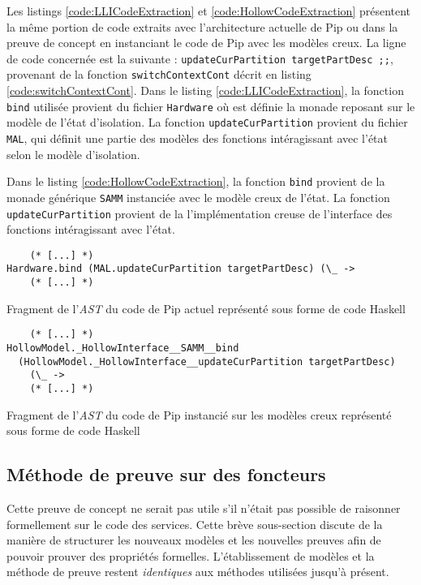 	Les listings \ref{code:LLICodeExtraction} et \ref{code:HollowCodeExtraction} présentent la même portion de code extraits avec l'architecture actuelle de Pip ou dans la preuve de concept en instanciant le code de Pip avec les modèles creux. La ligne de code concernée est la suivante : \texttt{updateCurPartition targetPartDesc ;;}, provenant de la fonction \texttt{switchContextCont} décrit en listing \ref{code:switchContextCont}. Dans le listing \ref{code:LLICodeExtraction}, la fonction \texttt{bind} utilisée provient du fichier \texttt{Hardware} où est définie la monade reposant sur le modèle de l'état d'isolation. La fonction \texttt{updateCurPartition} provient du fichier \texttt{MAL}, qui définit une partie des modèles des fonctions intéragissant avec l'état selon le modèle d'isolation.

	Dans le listing \ref{code:HollowCodeExtraction}, la fonction \texttt{bind} provient de la monade générique \texttt{SAMM} instanciée avec le modèle creux de l'état. La fonction \texttt{updateCurPartition} provient de la l'implémentation creuse de l'interface des fonctions intéragissant avec l'état.

	\begin{listing}[!ht]
	\begin{verbatim}
    (* [...] *)
Hardware.bind (MAL.updateCurPartition targetPartDesc) (\_ ->
    (* [...] *)
	\end{verbatim}
	\caption{Fragment de l'\emph{AST} du code de Pip actuel représenté sous forme de code Haskell}
	\label{code:LLICodeExtraction}
	\end{listing}

	\begin{listing}[!ht]
	\begin{verbatim}
    (* [...] *)
HollowModel._HollowInterface__SAMM__bind
  (HollowModel._HollowInterface__updateCurPartition targetPartDesc)
    (\_ ->
    (* [...] *)
	\end{verbatim}
	\caption{Fragment de l'\emph{AST} du code de Pip instancié sur les modèles creux représenté sous forme de code Haskell}
	\label{code:HollowCodeExtraction}
	\end{listing}

		\subsection{Méthode de preuve sur des foncteurs}

		Cette preuve de concept ne serait pas utile s'il n'était pas possible de raisonner formellement sur le code des services. Cette brève sous-section discute de la manière de structurer les nouveaux modèles et les nouvelles preuves afin de pouvoir prouver des propriétés formelles. L'établissement de modèles et la méthode de preuve restent \emph{identiques} aux méthodes utilisées jusqu'à présent.

